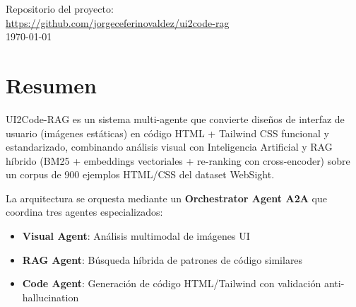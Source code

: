 \documentclass[12pt,a4paper]{article}
\begin{document}
\begin{titlepage}
        {\large Repositorio del proyecto:\\[0.2cm]}
        \url{https://github.com/jorgeceferinovaldez/ui2code-rag}\\[0.5cm]
            {\small \today}


\end{titlepage}

\tableofcontents
\newpage

\section{Resumen}

UI2Code-RAG es un sistema multi-agente que convierte diseños de interfaz de usuario (imágenes estáticas) en código HTML + Tailwind CSS funcional y estandarizado, combinando análisis visual con Inteligencia Artificial y RAG híbrido (BM25 + embeddings vectoriales + re-ranking con cross-encoder) sobre un corpus de 900 ejemplos HTML/CSS del dataset WebSight.

La arquitectura se orquesta mediante un \textbf{Orchestrator Agent A2A} que coordina tres agentes especializados:
\begin{itemize}
    \item \textbf{Visual Agent}: Análisis multimodal de imágenes UI
    \item \textbf{RAG Agent}: Búsqueda híbrida de patrones de código similares
    \item \textbf{Code Agent}: Generación de código HTML/Tailwind con validación anti-hallucination
\end{itemize}
\end{document}
